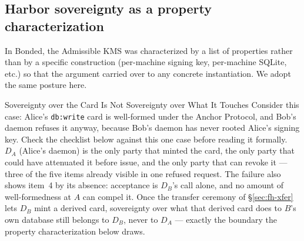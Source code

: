 \documentclass[11pt,a4paper]{article}
\theoremstyle{definition}
\theoremstyle{remark}
\begin{document}
\subsection{Harbor sovereignty as a property \mbox{characterization}}\label{sec:fh-sovereignty}
In Bonded, the Admissible KMS was characterized by a list of properties rather than by a specific construction (per-machine signing key, per-machine SQLite, etc.) so that the argument carried over to any concrete instantiation. We adopt the same posture here.
\begin{pdexample}{Sovereignty over the Card Is Not Sovereignty over What It Touches}
\setlength{\parskip}{4pt plus 1pt}
%
Consider this case: Alice's \texttt{db:write} card is well-formed under the Anchor Protocol, and Bob's daemon refuses it anyway, because Bob's daemon has never rooted Alice's signing key. Check the checklist below against this one case before reading it formally.
$D_A$ (Alice's daemon) is the only party that minted the card, the only party that could have attenuated it before issue, and the only party that can revoke it --- three of the five items already visible in one refused request.
The failure also shows item~4 by its absence: acceptance is $D_B$'s call alone, and no amount of well-formedness at $A$ can compel it.
Once the transfer ceremony of \S\ref{sec:fh-xfer} lets $D_B$ mint a derived card, sovereignty over what that derived card does to $B$'s own database still belongs to $D_B$, never to $D_A$ --- exactly the boundary the property characterization below draws.
\end{pdexample}
\end{document}
